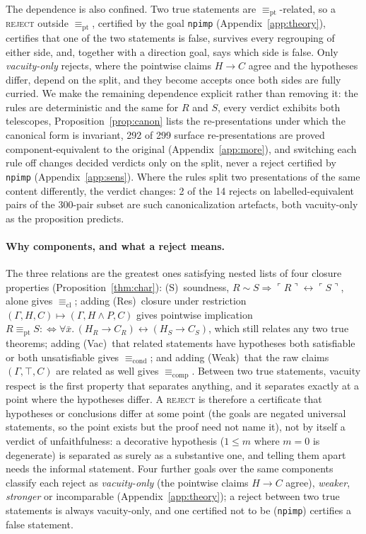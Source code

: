 \documentclass[10pt]{article}
\theoremstyle{definition}
\newcommand{\Cl}[1]{\ulcorner #1 \urcorner}
\newcommand{\Ecl}{\mathrel{\equiv_{\mathrm{cl}}}}
\newcommand{\Econd}{\mathrel{\equiv_{\mathrm{cond}}}}
\newcommand{\Ecomp}{\mathrel{\equiv_{\mathrm{comp}}}}
\newcommand{\Epi}{\mathrel{\equiv_{\mathrm{pt}}}}
\newcommand{\V}[1]{\textsc{#1}}
\begin{document}
The dependence is also confined. Two true statements are $\Epi$-related, so a \V{reject} outside
$\Epi$, certified by the goal \texttt{npimp} (Appendix~\ref{app:theory}), certifies that one of the
two statements is false, survives every regrouping of either side, and, together with a direction
goal, says which side is false. Only \emph{vacuity-only} rejects, where the pointwise claims
$H\to C$ agree and the hypotheses differ, depend on the split, and they become accepts once both
sides are fully curried. We make the remaining dependence explicit rather than removing it: the
rules are deterministic and the same for $R$ and $S$, every verdict exhibits both telescopes,
Proposition~\ref{prop:canon} lists the re-presentations under which the canonical form is
invariant, 292 of 299 surface re-presentations are proved component-equivalent to the original
(Appendix~\ref{app:more}), and switching each rule off changes decided verdicts only on the
split, never a reject certified by \texttt{npimp} (Appendix~\ref{app:sens}). Where the rules split two presentations of the same content differently, the verdict
changes: 2 of the 14 rejects on labelled-equivalent pairs of the 300-pair subset are such
canonicalization artefacts, both vacuity-only as the proposition predicts.

\paragraph{Why components, and what a reject means.} The three relations are the greatest ones
satisfying nested lists of four closure properties (Proposition~\ref{thm:char}): (S)~soundness,
$R\sim S\Rightarrow\Cl R\leftrightarrow\Cl S$, alone gives $\Ecl$; adding (Res)~closure under
restriction $(\Gamma,H,C)\mapsto(\Gamma,H\wedge P,C)$ gives pointwise implication
$R\Epi S:\iff\forall\bar x.\,(H_R\to C_R)\leftrightarrow(H_S\to C_S)$, which still relates any two true theorems;
adding (Vac)~that related statements have hypotheses both satisfiable or both unsatisfiable gives
$\Econd$; and adding (Weak)~that the raw claims $(\Gamma,\top,C)$ are related as well gives $\Ecomp$. Between two true statements, vacuity respect is the first property
that separates anything, and it separates exactly at a point where the hypotheses differ. A
\V{reject} is therefore a certificate that hypotheses or conclusions differ at some point (the
goals are negated universal statements, so the point exists but the proof need not name it),
not by itself a verdict of unfaithfulness: a decorative hypothesis ($1\le m$ where $m=0$ is
degenerate) is separated as surely as a substantive one, and telling them apart needs the
informal statement. Four further goals over the same components classify each reject as
\emph{vacuity-only} (the pointwise claims $H\to C$ agree), \emph{weaker}, \emph{stronger} or
incomparable (Appendix~\ref{app:theory}); a reject between two true statements is always
vacuity-only, and one certified not to be (\texttt{npimp}) certifies a false statement.
\end{document}

